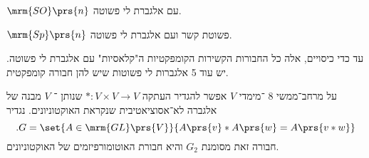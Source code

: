 \documentclass[10pt, twoside]{book}
\begin{document}
\begin{example}
$\mrm{SO}\prs{n}$
עם אלגברת לי פשוטה.
\end{example}

\begin{example}
$\mrm{Sp}\prs{n}$
פשוטת קשר ועם אלגברת לי פשוטה.
\end{example}

\begin{remark}
עד כדי כיסויים, אלה כל החבורות הקשירות הקומפקטיות ה"קלאסיות" עם אלגברת לי פשוטה. יש עוד 5 אלגברות לי פשוטות שיש להן חבורה קומפקטית.
\end{remark}

\begin{example}
על מרחב־ממשי
$8$%
־מימדי
$V$
אפשר להגדיר העתקה
$* \colon V \times V \to V$
שנותן ־%
$V$
מבנה של אלגברה לא־אסוציאטיבית שנקראת האוקטוניונים.
נגדיר
\[\text{.} G = \set{A \in \mrm{GL}\prs{V}}{A\prs{v} * A\prs{w} = A\prs{v * w}}\]
חבורה זאת מסומנת
$G_2$
והיא חבורת האוטומורפיזמים של האוקטוניונים.
\end{example}
\end{document}
